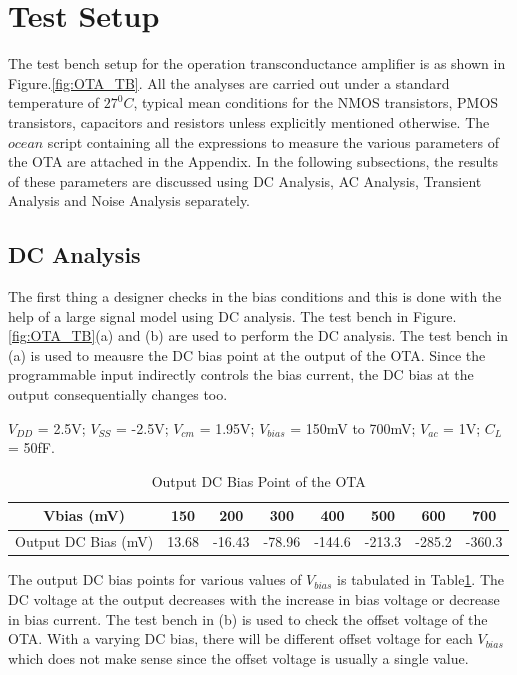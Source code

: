 \section{Test Setup}
The test bench setup for the operation transconductance amplifier is as shown in Figure.\ref{fig:OTA_TB}. All the analyses are carried out under a standard temperature of $27^0C$, typical mean conditions for the NMOS transistors, PMOS transistors, capacitors and resistors unless explicitly mentioned otherwise. The $ocean$ script containing all the expressions to measure the various parameters of the OTA are attached in the Appendix. In the following subsections, the results of these parameters are discussed using DC Analysis, AC Analysis, Transient Analysis and Noise Analysis separately.

\subsection{DC Analysis}
The first thing a designer checks in the bias conditions and this is done with the help of a large signal model using DC analysis. The test bench in Figure.\ref{fig:OTA_TB}(a) and (b) are used to perform the DC analysis. The test bench in (a) is used to meausre the DC bias point at the output of the OTA. Since the programmable input indirectly controls the bias current, the DC bias at the output consequentially changes too.
 
$V_{DD}$ = 2.5V; $V_{SS}$ = -2.5V; $V_{cm}$ = 1.95V; $V_{bias}$ = 150mV to 700mV;  $V_{ac}$ = 1V; $C_{L}$ = 50fF.

\begin{table} [H]
\centering
\begin{tabular}{@{}cccccccc@{}}
\toprule
Vbias (mV)					& 150		& 200			& 300			& 400			& 500			& 600			& 700 \\ \midrule
Output DC Bias (mV)			& 13.68		& -16.43		& -78.96		& -144.6		& -213.3		& -285.2		& -360.3 \\
\bottomrule
\end{tabular}
\caption{Output DC Bias Point of the OTA}
\label{tab:OTA_DC_Bias}
\end{table}

The output DC bias points for various values of $V_{bias}$ is tabulated in Table\ref{tab:OTA_DC_Bias}. The DC voltage at the output decreases with the increase in bias voltage or decrease in bias current. The test bench in (b) is used to check the offset voltage of the OTA. With a varying DC bias, there will be different offset voltage for each $V_{bias}$ which does not make sense since the offset voltage is usually a single value.

